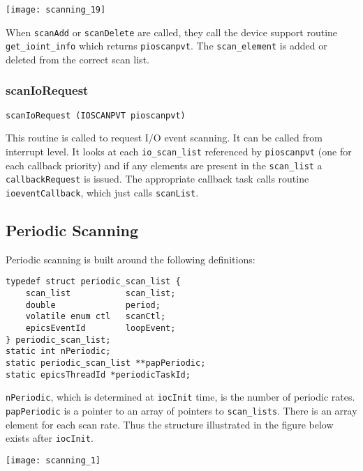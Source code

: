 \begin{center}
\texttt{[image: scanning\_19]}
\end{center}

When \verb|scanAdd| or \verb|scanDelete| are called, they call the device support routine \verb|get_ioint_info| which returns \verb|pioscanpvt|.
The \verb|scan_element| is added or deleted from the correct scan list.

\subsubsection{scanIoRequest}

\begin{verbatim}
scanIoRequest (IOSCANPVT pioscanpvt)
\end{verbatim}

This routine is called to request I/O event scanning.
It can be called from interrupt level.
It looks at each \verb|io_scan_list| referenced by \verb|pioscanpvt| (one for each callback priority) and if any elements are present in the \verb|scan_list| a \verb|callbackRequest| is issued.
The appropriate callback task calls routine \verb|ioeventCallback|, which just calls \verb|scanList|. 

\subsection{Periodic Scanning}

Periodic scanning is built around the following definitions:

\begin{verbatim}
typedef struct periodic_scan_list {
    scan_list           scan_list;
    double              period;
    volatile enum ctl   scanCtl;
    epicsEventId        loopEvent;
} periodic_scan_list;
static int nPeriodic;
static periodic_scan_list **papPeriodic;
static epicsThreadId *periodicTaskId;
\end{verbatim}

\verb|nPeriodic|, which is determined at \verb|iocInit| time, is the number of periodic rates.
\verb|papPeriodic| is a pointer to an array of pointers to \verb|scan_lists|.
There is an array element for each scan rate.
Thus the structure illustrated in the figure below exists after \verb|iocInit|.

\begin{center}
\texttt{[image: scanning\_1]}
\end{center}

